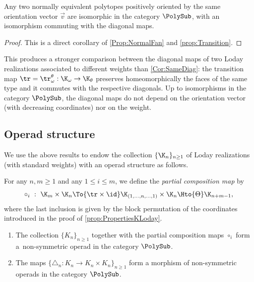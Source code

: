 \begin{corollary}
Any two normally equivalent polytopes positively oriented by the same orientation vector $\vec v$
are isomorphic in the category $\PolySub$, with an isomorphism commuting with the diagonal maps.
\end{corollary}

\begin{proof}
This is a direct corollary of \cref{Prop:NormalFan} and \cref{prop:Transition}.
\end{proof}

This produces a stronger comparison between the diagonal maps of two Loday realizations associated to different weights than \cref{Cor:SameDiag}: the transition map \hbox{$\tr=\tr_\omega^\theta : \K_\omega \to \K_\theta$}
preserves homeomorphically the faces of the same type and it commutes with the respective diagonals. Up to isomorphisms in the category $\PolySub$, the diagonal maps
do not depend on the orientation vector (with decreasing coordinates) nor on the weight.

\subsection{Operad structure}
We use the above results to endow the collection $\{\K_n\}_{n\geq 1}$ of Loday realizations (with standard weights) with an operad structure as follows.

\begin{definition}
For any $n,m\geq 1$ and any $1\leq i \leq m$, we define the \emph{partial composition map} by
\[
\circ_i\ : \ \K_m\times \K_n
\To{\tr\times \id} \K_{(1,\ldots,n,\ldots,1)}\times \K_n
\Hto{\Theta}
\K_{n+m-1},
\]
where the last inclusion is given by the block permutation of the coordinates introduced in the proof of \cref{prop:PropertiesKLoday}.
\end{definition}

\skpt
\begin{theorem}\label{thm:MainOperad}
\begin{enumerate}
\item The collection $\{K_n\}_{n\geq 1}$ together with the partial composition maps $\circ_i$ form a~non-symmetric operad in the category $\PolySub$.

\item The maps $\{\triangle_n : K_n \to K_n\times K_n\}_{n\geq 1}$ form a morphism of non-symmetric operads in the category $\PolySub$.
\end{enumerate}
\end{theorem}

